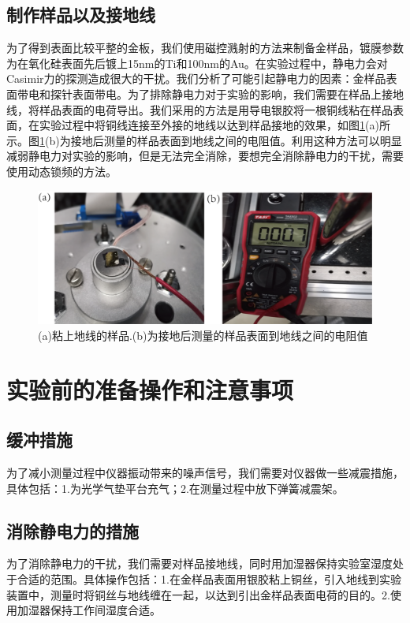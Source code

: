 \subsection{制作样品以及接地线}
为了得到表面比较平整的金板，我们使用磁控溅射的方法来制备金样品，镀膜参数为在氧化硅表面先后镀上15nm的Ti和100nm的Au。在实验过程中，静电力会对Casimir力的探测造成很大的干扰。我们分析了可能引起静电力的因素：金样品表面带电和探针表面带电。为了排除静电力对于实验的影响，我们需要在样品上接地线，将样品表面的电荷导出。我们采用的方法是用导电银胶将一根铜线粘在样品表面，在实验过程中将铜线连接至外接的地线以达到样品接地的效果，如图\ref{fig:10}(a)所示。图\ref{fig:10}(b)为接地后测量的样品表面到地线之间的电阻值。利用这种方法可以明显减弱静电力对实验的影响，但是无法完全消除，要想完全消除静电力的干扰，需要使用动态锁频的方法\cite{deMan_2009}。
\begin{figure}[h]
	\centering
	\includegraphics[scale=0.6]{figures/消除静电力}
	\caption{(a)粘上地线的样品.(b)为接地后测量的样品表面到地线之间的电阻值}
	\label{fig:10}
\end{figure}
\section{实验前的准备操作和注意事项}
\paragraph*{}
\subsection{缓冲措施}
为了减小测量过程中仪器振动带来的噪声信号，我们需要对仪器做一些减震措施，具体包括：1.为光学气垫平台充气；2.在测量过程中放下弹簧减震架。
\subsection{消除静电力的措施}
为了消除静电力的干扰，我们需要对样品接地线，同时用加湿器保持实验室湿度处于合适的范围。具体操作包括：1.在金样品表面用银胶粘上铜丝，引入地线到实验装置中，测量时将铜丝与地线缠在一起，以达到引出金样品表面电荷的目的。2.使用加湿器保持工作间湿度合适。
